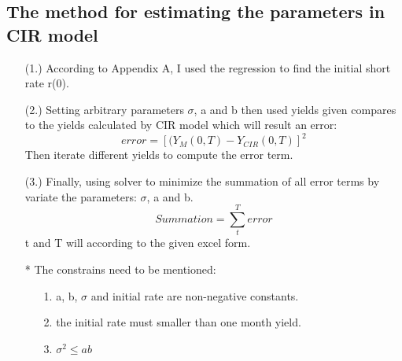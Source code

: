 \documentclass[14pt]{extarticle}
\begin{document}
\subsection{The method for estimating the parameters in CIR model}
\begin{itemize}
    \item [(1.)]According to Appendix A, I used the regression to find the initial short rate r(0). 
\end{itemize}
\begin{itemize}
    \item [(2.)] Setting arbitrary parameters $\sigma $, a and b then used yields given compares to the yields calculated by CIR model which will result an error:
    $$ error=[(Y_M(0,T)-Y_{CIR}(0,T)]^2$$
    Then iterate different yields to compute the error term.
\end{itemize}
\begin{itemize}
    \item [(3.)]Finally, using solver to minimize the summation of all error terms by variate the parameters: $\sigma $, a and b.
    $$Summation=\sum_{t}^{T} error$$
    t and T will according to the given excel form.
 
\end{itemize}
  \begin{itemize}
        \item [*] The constrains need to be mentioned:
        \begin{itemize}
            \item [1.] a, b, $\sigma$ and initial rate are non-negative constants.
        \end{itemize}
        \begin{itemize}
            \item [2.] the initial rate must smaller than one month yield.
        \end{itemize}
        \begin{itemize}
            \item [3.]$\sigma^2\leq ab $
        \end{itemize}
    \end{itemize}
\end{document}
